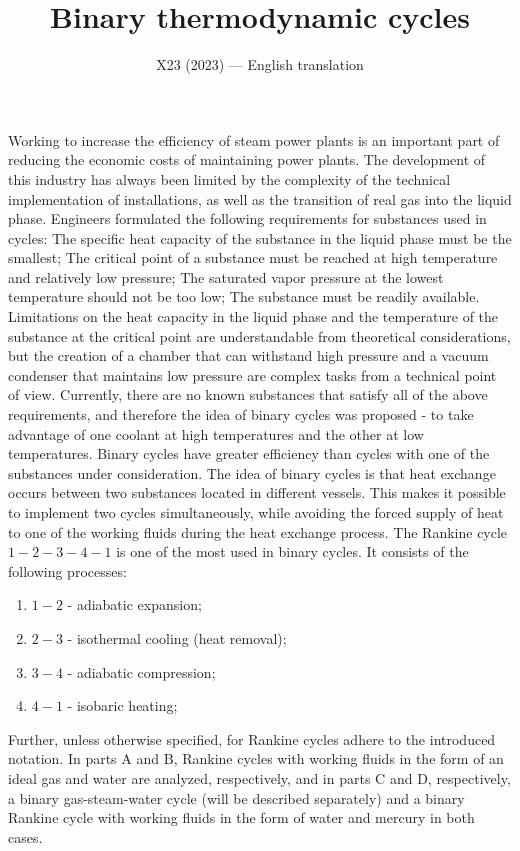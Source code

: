 \documentclass[11pt,a4paper]{article}
\title{\textbf{Binary thermodynamic cycles}}
\author{\normalsize X23 (2023) --- English translation}
\date{}
\begin{document}
\maketitle

Working to increase the efficiency of steam power plants is an important part of reducing the economic costs of maintaining power plants. The development of this industry has always been limited by the complexity of the technical implementation of installations, as well as the transition of real gas into the liquid phase. Engineers formulated the following requirements for substances used in cycles: The specific heat capacity of the substance in the liquid phase must be the smallest; The critical point of a substance must be reached at high temperature and relatively low pressure; The saturated vapor pressure at the lowest temperature should not be too low; The substance must be readily available. Limitations on the heat capacity in the liquid phase and the temperature of the substance at the critical point are understandable from theoretical considerations, but the creation of a chamber that can withstand high pressure and a vacuum condenser that maintains low pressure are complex tasks from a technical point of view. Currently, there are no known substances that satisfy all of the above requirements, and therefore the idea of binary cycles was proposed - to take advantage of one coolant at high temperatures and the other at low temperatures. Binary cycles have greater efficiency than cycles with one of the substances under consideration. The idea of binary cycles is that heat exchange occurs between two substances located in different vessels. This makes it possible to implement two cycles simultaneously, while avoiding the forced supply of heat to one of the working fluids during the heat exchange process. The Rankine cycle $1-2-3-4-1$ is one of the most used in binary cycles. It consists of the following processes:
\begin{enumerate}
    \item $1-2$ - adiabatic expansion;
    \item $2-3$ - isothermal cooling (heat removal);
    \item $3-4$ - adiabatic compression;
    \item $4-1$ - isobaric heating;
\end{enumerate}
Further, unless otherwise specified, for Rankine cycles adhere to the introduced notation. In parts $\mathrm{A}$ and $\mathrm{B}$, Rankine cycles with working fluids in the form of an ideal gas and water are analyzed, respectively, and in parts $\mathrm{C}$ and $\mathrm{D}$, respectively, a binary gas-steam-water cycle (will be described separately) and a binary Rankine cycle with working fluids in the form of water and mercury in both cases.
\end{document}
